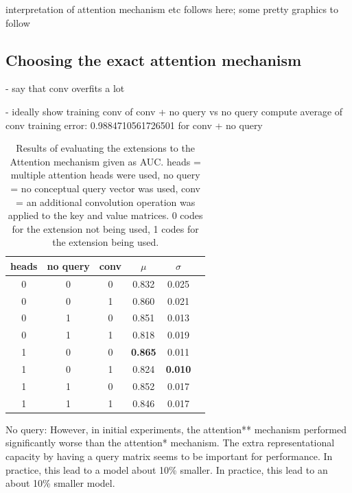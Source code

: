 
interpretation of attention mechanism etc follows here; some pretty graphics to follow

\subsection{Choosing the exact attention mechanism} \label{subsubsec:attn_hyperparams}
- say that conv overfits a lot

- ideally show training conv of conv + no query vs no query
compute average of conv training error: 0.9884710561726501 for conv + no query


\begin{table}[h!]
	\centering
	\begin{tabular}{| c c c | c c | c} 
		\hline
		heads & no query & conv & $\mu$ & $\sigma$ \\
		\hline
		0 & 0 & 0 & 0.832 & 0.025 \\
		0 & 0 & 1 & 0.860 & 0.021 \\
		0 & 1 & 0 & 0.851 & 0.013 \\
		0 & 1 & 1 & 0.818 & 0.019 \\
		1 & 0 & 0 & \textbf{0.865} & 0.011 \\
		1 & 0 & 1 & 0.824 & \textbf{0.010} \\
		1 & 1 & 0 & 0.852 & 0.017 \\
		1 & 1 & 1 & 0.846 & 0.017 \\
		\hline
	\end{tabular}
	\caption{Results of evaluating the extensions to the Attention mechanism given as AUC. heads = multiple attention heads were used, no query = no conceptual query vector was used, conv = an additional convolution operation was applied to the key and value matrices. 0 codes for the extension not being used, 1 codes for the extension being used.
	}
	\label{table:attn_gridsearch}
\end{table}

No query: 
However, in initial experiments, the attention** mechanism performed significantly worse than the attention* mechanism. The extra representational capacity by having a query matrix seems to be important for performance. 
In practice, this lead to a model about 10\% smaller. 
In practice, this lead to an about 10\% smaller model.

